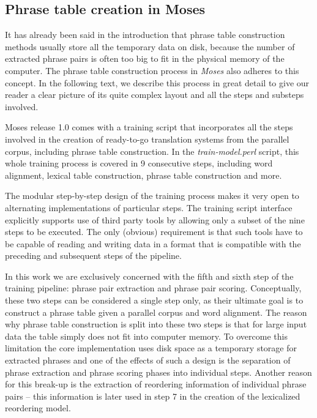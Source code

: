 \subsection{Phrase table creation in Moses}
\label{sec:phrase-table-creation-in-moses}

It has already been said in the introduction that phrase table construction methods
usually store all the temporary data on disk, because the number of extracted
phrase pairs is often too big to fit in the physical memory of the computer.
The phrase table construction process in \emph{Moses} also adheres to this concept.
In the following text, we describe this process in great detail to give our reader
a clear picture of its quite complex layout and all the steps and substeps involved.

Moses release 1.0 comes
with a training script that incorporates all the steps involved in the creation of
ready-to-go translation systems from the parallel corpus, including phrase table construction.
In the \emph{train-model.perl} script, this whole training process is covered in
9 consecutive steps,
including word alignment, lexical table construction, phrase table construction and more.

The modular step-by-step design of the training process makes it very open to
alternating implementations of particular steps.
The training script interface explicitly supports use of third party tools by
allowing only a subset of the nine steps to be executed.
The only (obvious) requirement is that such tools have to be capable of reading and
writing data in a format that is compatible with the preceding and subsequent steps
of the pipeline.

In this work we are exclusively concerned with the fifth and sixth step of
the training pipeline:
phrase pair extraction
and phrase pair scoring.
Conceptually, these two steps can be considered a single step only, as their ultimate
goal is to construct a phrase table given a parallel corpus and word alignment.
The reason why phrase table construction is split into these two steps is that
for large input data the table simply does not fit into computer memory.
To overcome this limitation the core implementation uses disk space as a temporary storage
for extracted phrases and one of the effects of such a design is the separation of
phrase extraction and phrase scoring phases into individual steps.
Another reason for this break-up is the extraction of reordering information
of individual phrase pairs -- this information is later used in step 7 in the creation
of the lexicalized reordering model.

